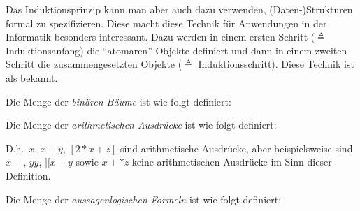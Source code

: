 Das Induktionsprinzip kann man aber auch dazu verwenden,
(Daten-)Strukturen formal zu spezifizieren. Diese macht diese Technik für Anwendungen
in der Informatik besonders interessant. Dazu werden in einem
ersten Schritt ($\triangleq$ Induktionsanfang) die "`atomaren"'
Objekte definiert und dann in einem zweiten Schritt die
zusammengesetzten Objekte ($\triangleq$ Induktionsschritt). Diese
Technik ist als  bekannt.

\begin{example}
\noindent Die Menge der \emph{binären Bäume} ist wie folgt definiert:

\medskip

\end{example}

\begin{example}
\label{induexp}
\noindent Die Menge der \emph{arithmetischen Ausdrücke} ist wie folgt definiert:

\medskip


\medskip

\noindent D.h.~$x$, $x+y$, $[2*x + z]$ sind arithmetische Ausdrücke,
aber beispielsweise sind $x + $, $yy$, $][x+y$ sowie $x +* z$ keine
arithmetischen Ausdrücke im Sinn dieser Definition.
\end{example}

\begin{example}
\label{indubool}
\noindent Die Menge der \emph{aussagenlogischen Formeln} ist wie folgt definiert:

\medskip

\end{example}

